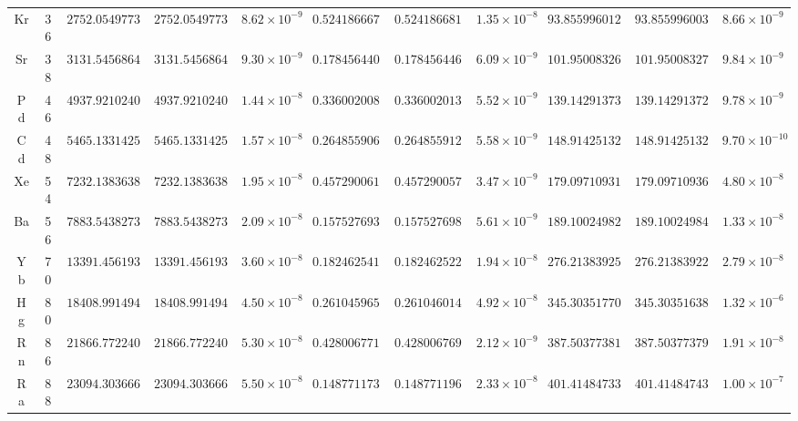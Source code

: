 \begin{table}[!htbp]
{\begin{tabular}{@{}c c ccc ccc ccc@{}}
        Kr & 36 & $2752.054977337$ & $2752.054977346$ & $8.62\times10^{-9}$ & $0.52418666755$ & $0.52418668103$ & $1.35\times10^{-8}$ & $93.85599601220$ & $93.85599600354$ & $8.66\times10^{-9}$ \\
        Sr & 38 & $3131.545686429$ & $3131.545686439$ & $9.30\times10^{-9}$ & $0.17845644076$ & $0.17845644685$ & $6.09\times10^{-9}$ & $101.9500832606$ & $101.9500832705$ & $9.84\times10^{-9}$ \\
        Pd & 46 & $4937.921024056$ & $4937.921024070$ & $1.44\times10^{-8}$ & $0.33600200815$ & $0.33600201367$ & $5.52\times10^{-9}$ & $139.1429137365$ & $139.1429137267$ & $9.78\times10^{-9}$ \\
        Cd & 48 & $5465.133142514$ & $5465.133142530$ & $1.57\times10^{-8}$ & $0.26485590698$ & $0.26485591255$ & $5.58\times10^{-9}$ & $148.9142513282$ & $148.9142513291$ & $9.70\times10^{-10}$ \\
        Xe & 54 & $7232.138363852$ & $7232.138363872$ & $1.95\times10^{-8}$ & $0.45729006132$ & $0.45729005785$ & $3.47\times10^{-9}$ & $179.0971093189$ & $179.0971093669$ & $4.80\times10^{-8}$ \\
        Ba & 56 & $7883.543827310$ & $7883.543827330$ & $2.09\times10^{-8}$ & $0.15752769303$ & $0.15752769864$ & $5.61\times10^{-9}$ & $189.1002498282$ & $189.1002498415$ & $1.33\times10^{-8}$ \\
        Yb & 70 & $13391.45619308$ & $13391.45619312$ & $3.60\times10^{-8}$ & $0.18246254162$ & $0.18246252223$ & $1.94\times10^{-8}$ & $276.2138392544$ & $276.2138392265$ & $2.79\times10^{-8}$ \\
        Hg & 80 & $18408.99149490$ & $18408.99149494$ & $4.50\times10^{-8}$ & $0.26104596502$ & $0.26104601419$ & $4.92\times10^{-8}$ & $345.3035177000$ & $345.3035163829$ & $1.32\times10^{-6}$ \\
        Rn & 86 & $21866.77224082$ & $21866.77224087$ & $5.30\times10^{-8}$ & $0.42800677179$ & $0.42800676968$ & $2.12\times10^{-9}$ & $387.5037738100$ & $387.5037737909$ & $1.91\times10^{-8}$ \\
        Ra & 88 & $23094.30366637$ & $23094.30366642$ & $5.50\times10^{-8}$ & $0.14877117348$ & $0.14877119673$ & $2.33\times10^{-8}$ & $401.4148473300$ & $401.4148474301$ & $1.00\times10^{-7}$ \\
        \bottomrule
    \end{tabular}%
    }
\end{table}

